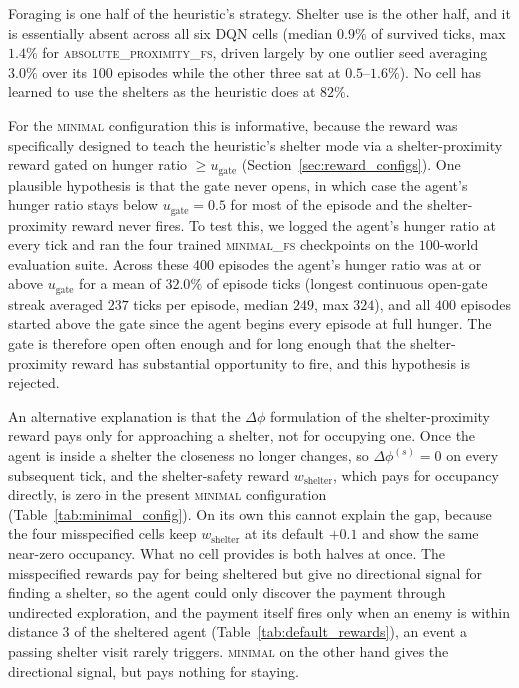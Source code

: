 \documentclass[12pt,a4paper,titlepage]{article}
\begin{document}
Foraging is one half of the heuristic's strategy. Shelter use is the other half, and it is essentially absent across all six DQN cells (median $0.9\%$ of survived ticks, max $1.4\%$ for \textsc{absolute\_proximity\_fs}, driven largely by one outlier seed averaging $3.0\%$ over its $100$ episodes while the other three sat at $0.5$--$1.6\%$). No cell has learned to use the shelters as the heuristic does at $82\%$.

For the \textsc{minimal} configuration this is informative, because the reward was specifically designed to teach the heuristic's shelter mode via a shelter-proximity reward gated on hunger ratio $\geq u_\text{gate}$ (Section~\ref{sec:reward_configs}). One plausible hypothesis is that the gate never opens, in which case the agent's hunger ratio stays below $u_\text{gate} = 0.5$ for most of the episode and the shelter-proximity reward never fires. To test this, we logged the agent's hunger ratio at every tick and ran the four trained \textsc{minimal\_fs} checkpoints on the $100$-world evaluation suite. Across these $400$ episodes the agent's hunger ratio was at or above $u_\text{gate}$ for a mean of $32.0\%$ of episode ticks (longest continuous open-gate streak averaged $237$ ticks per episode, median $249$, max $324$), and all $400$ episodes started above the gate since the agent begins every episode at full hunger. The gate is therefore open often enough and for long enough that the shelter-proximity reward has substantial opportunity to fire, and this hypothesis is rejected.

An alternative explanation is that the $\Delta\phi$ formulation of the shelter-proximity reward pays only for approaching a shelter, not for occupying one. Once the agent is inside a shelter the closeness no longer changes, so $\Delta\phi^{(s)} = 0$ on every subsequent tick, and the shelter-safety reward $w_\text{shelter}$, which pays for occupancy directly, is zero in the present \textsc{minimal} configuration (Table~\ref{tab:minimal_config}). On its own this cannot explain the gap, because the four misspecified cells keep $w_\text{shelter}$ at its default $+0.1$ and show the same near-zero occupancy. What no cell provides is both halves at once. The misspecified rewards pay for being sheltered but give no directional signal for finding a shelter, so the agent could only discover the payment through undirected exploration, and the payment itself fires only when an enemy is within distance $3$ of the sheltered agent (Table~\ref{tab:default_rewards}), an event a passing shelter visit rarely triggers. \textsc{minimal} on the other hand gives the directional signal, but pays nothing for staying.
\end{document}
